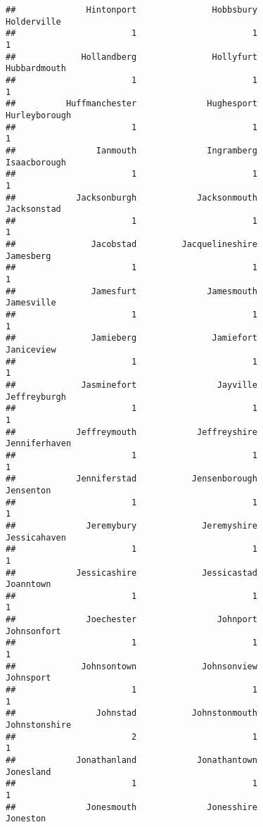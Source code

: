 \documentclass[
]{article}
\begin{document}
\begin{verbatim}
##              Hintonport               Hobbsbury             Holderville 
##                       1                       1                       1 
##             Hollandberg               Hollyfurt            Hubbardmouth 
##                       1                       1                       1 
##          Huffmanchester              Hughesport           Hurleyborough 
##                       1                       1                       1 
##                Ianmouth              Ingramberg            Isaacborough 
##                       1                       1                       1 
##            Jacksonburgh            Jacksonmouth             Jacksonstad 
##                       1                       1                       1 
##               Jacobstad         Jacquelineshire               Jamesberg 
##                       1                       1                       1 
##               Jamesfurt              Jamesmouth              Jamesville 
##                       1                       1                       1 
##               Jamieberg               Jamiefort              Janiceview 
##                       1                       1                       1 
##             Jasminefort                Jayville            Jeffreyburgh 
##                       1                       1                       1 
##            Jeffreymouth            Jeffreyshire           Jenniferhaven 
##                       1                       1                       1 
##            Jenniferstad           Jensenborough               Jensenton 
##                       1                       1                       1 
##              Jeremybury             Jeremyshire            Jessicahaven 
##                       1                       1                       1 
##            Jessicashire             Jessicastad               Joanntown 
##                       1                       1                       1 
##              Joechester                Johnport             Johnsonfort 
##                       1                       1                       1 
##             Johnsontown             Johnsonview               Johnsport 
##                       1                       1                       1 
##                Johnstad           Johnstonmouth           Johnstonshire 
##                       2                       1                       1 
##            Jonathanland            Jonathantown               Jonesland 
##                       1                       1                       1 
##              Jonesmouth              Jonesshire                Joneston 

\end{verbatim}
\end{document}
